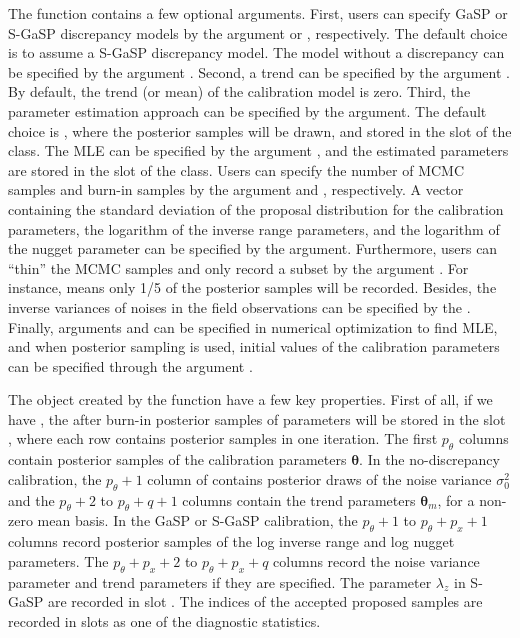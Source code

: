 The  function contains a few  optional arguments. First, users can specify GaSP or S-GaSP  discrepancy models  by the argument   or , respectively. The default choice is to assume a S-GaSP discrepancy model. The model without a discrepancy can be specified by the argument . Second, a trend can be specified by the argument . By default, the trend (or mean) of the calibration model is zero. Third, the  parameter estimation approach can be specified by the  argument. The default choice is , where the posterior samples will be drawn, and stored in the slot  of the  class.    The MLE can be specified by the argument , and the estimated parameters are stored in the slot  of the  class.  Users can specify the number of MCMC samples and burn-in samples by the argument  and , respectively. A vector containing the standard deviation of the proposal distribution for the calibration parameters, the logarithm of the inverse range parameters, and the logarithm of the nugget parameter can be specified by the  argument. Furthermore, users can ``thin'' the MCMC samples and only record a subset by  the argument . For instance,  means only 1/5 of the posterior samples will be recorded.  
Besides, the inverse variances of noises in the field observations can be specified by the . Finally,   arguments  and  can be specified in numerical optimization to find MLE, and when posterior sampling is used,   initial values of the calibration parameters can be specified through the argument .

The object  created by the   function have a few key properties. First of all, if we have , the after burn-in posterior samples of parameters will be stored in the slot , where each row contains posterior samples in one iteration. The first $p_\theta$ columns contain posterior samples of the calibration parameters $\bm \theta$. In the no-discrepancy calibration, the $p_\theta+1$ column of  contains posterior draws of the noise variance $\sigma^2_0$ and the $p_\theta+2$ to $p_\theta+q+1$ columns contain the trend parameters $\bm \theta_m$, for a non-zero mean basis. In the GaSP or S-GaSP calibration, the $p_\theta+1$ to $p_\theta+p_x+1$ columns record  posterior samples of the log inverse range and log nugget parameters. The $p_\theta+p_x+2$ to $p_\theta+p_x+q$ columns record the noise variance parameter and trend parameters if they are specified. 
The parameter $\lambda_z$ in S-GaSP are recorded in slot . 
 The indices of the  accepted proposed samples are recorded in slots  as one of the diagnostic statistics. 

